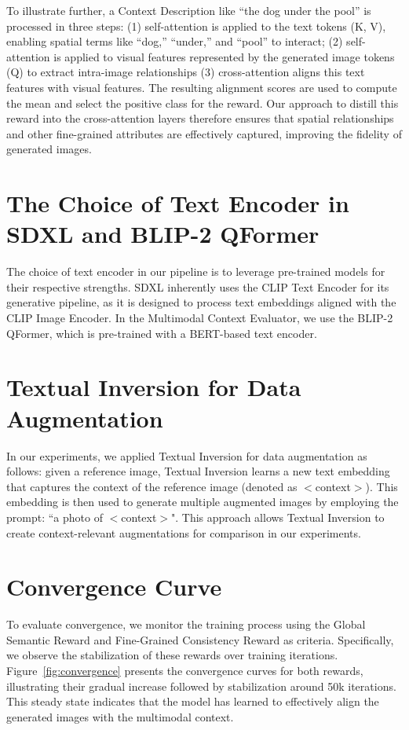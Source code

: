 To illustrate further, a Context Description like “the dog under the pool” is processed in three steps: (1) self-attention is applied to the text tokens (K, V), enabling spatial terms like “dog,” “under,” and “pool” to interact; (2) self-attention is applied to visual features represented by the generated image tokens (Q) to extract intra-image relationships (3) cross-attention aligns this text features with visual features. The resulting alignment scores are used to compute the mean and select the positive class for the reward. Our approach to distill this reward into the cross-attention layers therefore ensures that spatial relationships and other fine-grained attributes are effectively captured, improving the fidelity of generated images.


\section{The Choice of Text Encoder in SDXL and BLIP-2 QFormer}

The choice of text encoder in our pipeline is to leverage pre-trained models for their respective strengths. SDXL inherently uses the CLIP Text Encoder for its generative pipeline, as it is designed to process text embeddings aligned with the CLIP Image Encoder. In the Multimodal Context Evaluator, we use the BLIP-2 QFormer, which is pre-trained with a BERT-based text encoder.

\section{Textual Inversion for Data Augmentation}
In our experiments, we applied Textual Inversion for data augmentation as follows: given a reference image, Textual Inversion learns a new text embedding that captures the context of the reference image (denoted as $<$context$>$). This embedding is then used to generate multiple augmented images by employing the prompt: ``a photo of $<$context$>$". This approach allows Textual Inversion to create context-relevant augmentations for comparison in our experiments.

\section{Convergence Curve}
To evaluate convergence, we monitor the training process using the Global Semantic Reward and Fine-Grained Consistency Reward as criteria. Specifically, we observe the stabilization of these rewards over training iterations. Figure~\ref{fig:convergence} presents the convergence curves for both rewards, illustrating their gradual increase followed by stabilization around 50k iterations. This steady state indicates that the model has learned to effectively align the generated images with the multimodal context.


